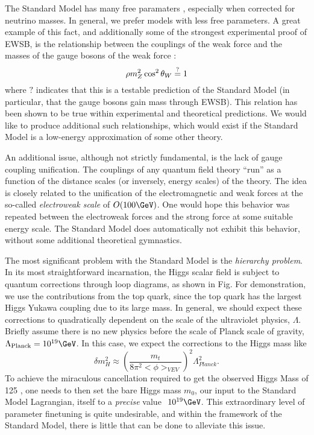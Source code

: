 The Standard Model has many free paramaters , especially when corrected for neutrino masses.
In general, we prefer models with less free parameters.
A great example of this fact, and additionally some of the strongest  experimental proof of EWSB, is the relationship between the couplings of the weak force and the masses of the gauge bosons of the weak force :
\begin{equation}
\rho \def \frac{m_W^2}{m_Z^2 \cos^2 \theta_W } \stackrel{?}{=} 1
\end{equation}
where $?$ indicates that this is a testable prediction of the Standard Model (in particular, that the gauge bosons gain mass through EWSB).
This relation has been shown to be true  within experimental and theoretical predictions.
We would like to produce additional such relationships, which would exist if the Standard Model is a low-energy approximation of some other theory.

An additional issue, although not strictly fundamental, is the lack of gauge coupling unification.
The couplings of any quantum field theory ``run'' as a function of the distance scales (or inversely, energy scales) of the theory.
The idea is closely related to the unification of the electromagnetic and weak forces at the so-called \textit{electroweak scale} of $O(100 \GeV)$.
One would hope this behavior was repeated between the electroweak forces and the strong force at some suitable energy scale.
The Standard Model does automatically not exhibit this behavior, without some additional theoretical gymnastics.

The most significant problem with the Standard Model is the \textit{hierarchy problem}.
In its most straightforward incarnation, the Higgs scalar field is subject to quantum corrections through loop diagrams, as shown in Fig.
For demonstration, we use the contributions from the top quark, since the top quark has the largest Higgs Yukawa coupling due to its large mass.
In general, we should expect these corrections to quadratically dependent on the scale of the ultraviolet physics, $\Lambda$.
Briefly assume there is no new physics before the scale of Planck scale of gravity, $\Lambda_{\text{Planck}} = 10^{19} \GeV$.
In this case, we expect the corrections to the Higgs mass like
\begin{equation}
\delta m^2_H \approx (\frac{m_t}{8\pi^2 <\phi>_{VEV}})^2 \Lambda_{Planck}^2.
\end{equation}
To achieve the miraculous cancellation required to get the observed Higgs Mass of 125 \GeV, one needs to then set  the bare Higgs mass $m_0$, our input to the Standard Model Lagrangian, itself to a \textit{precise} value $~ 10^{19} \GeV$.
This extraordinary level of parameter finetuning is quite undesirable, and within the framework of the Standard Model, there is little that can be done to alleviate this issue.


